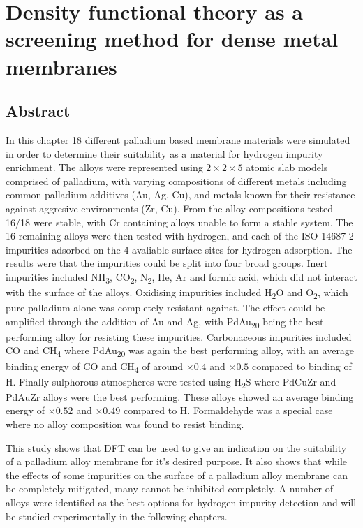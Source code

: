 \chapter{Density functional theory as a screening method for dense metal membranes}

\section*{Abstract}
In this chapter 18 different palladium based membrane materials were simulated in order to determine their suitability as a material for hydrogen impurity enrichment. The alloys were represented using $2\times 2\times 5$ atomic slab models comprised of palladium, with varying compositions of different metals including common palladium additives (Au, Ag, Cu), and metals known for their resistance against aggresive environments (Zr, Cu). From the alloy compositions tested 16/18 were stable, with Cr containing alloys unable to form a stable system. The 16 remaining alloys were then tested with hydrogen, and each of the ISO 14687-2 impurities adsorbed on the 4 avaliable surface sites for hydrogen adsorption. The results were that the impurities could be split into four broad groups. Inert impurities included NH\textsubscript{3}, CO\textsubscript{2}, N\textsubscript{2}, He, Ar and formic acid, which did not interact with the surface of the alloys. Oxidising impurities included H\textsubscript{2}O and O\textsubscript{2}, which pure palladium alone was completely resistant against. The effect could be amplified through the addition of Au and Ag, with PdAu\textsubscript{20} being the best performing alloy for resisting these impurities. Carbonaceous impurities included CO and CH\textsubscript{4} where PdAu\textsubscript{20} was again the best performing alloy, with an average binding energy of CO and CH\textsubscript{4} of around $\times 0.4$ and $\times 0.5$ compared to binding of H. Finally sulphorous atmospheres were tested using H\textsubscript{2}S where PdCuZr and PdAuZr alloys were the best performing. These alloys showed an average binding energy of $\times 0.52$ and $\times 0.49$ compared to H. Formaldehyde was a special case where no alloy composition was found to resist binding. 

This study shows that DFT can be used to give an indication on the suitability of a palladium alloy membrane for it's desired purpose. It also shows that while the effects of some impurities on the surface of a palladium alloy membrane can be completely mitigated, many cannot be inhibited completely. A number of alloys were identified as the best options for hydrogen impurity detection and will be studied experimentally in the following chapters.

